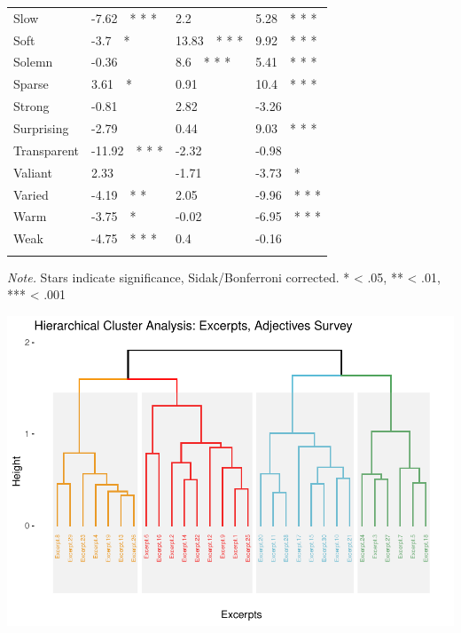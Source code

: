 \documentclass[
]{article}
\begin{document}
\begin{table}[tbp]
\begin{center}
\begin{threeparttable}
\begin{tabular}{llll}
Slow & -7.62\ \ * * * & 2.2 & 5.28\ \ * * *\\
Soft & -3.7\ \ * & 13.83\ \ * * * & 9.92\ \ * * *\\
Solemn & -0.36 & 8.6\ \ * * * & 5.41\ \ * * *\\
Sparse & 3.61\ \ * & 0.91 & 10.4\ \ * * *\\
Strong & -0.81 & 2.82 & -3.26\\
Surprising & -2.79 & 0.44 & 9.03\ \ * * *\\
Transparent & -11.92\ \ * * * & -2.32 & -0.98\\
Valiant & 2.33 & -1.71 & -3.73\ \ *\\
Varied & -4.19\ \ * * & 2.05 & -9.96\ \ * * *\\
Warm & -3.75\ \ * & -0.02 & -6.95\ \ * * *\\
Weak & -4.75\ \ * * * & 0.4 & -0.16\\
\bottomrule
\addlinespace
\end{tabular}

\begin{tablenotes}[para]
\normalsize{\textit{Note.} Stars indicate significance, Sidak/Bonferroni corrected. 
* < .05, ** < .01, *** < .001}
\end{tablenotes}

\end{threeparttable}
\end{center}

\end{table}

\begin{center}\includegraphics{MusDes_Supplementary_files/figure-latex/HCA.adj-1} \end{center}
\end{document}
